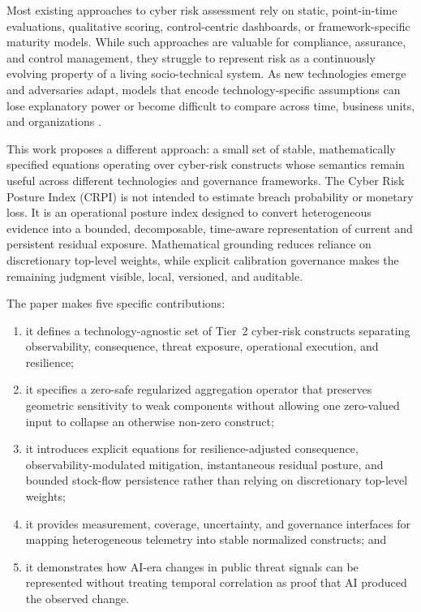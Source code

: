 \documentclass[11pt]{article}
\begin{document}
Most existing approaches to cyber risk assessment rely on static, point-in-time
evaluations, qualitative scoring, control-centric dashboards, or framework-specific
maturity models. While such approaches are valuable for compliance, assurance, and
control management, they struggle to represent risk as a continuously evolving
property of a living socio-technical system. As new technologies emerge and
adversaries adapt, models that encode technology-specific assumptions can lose
explanatory power or become difficult to compare across time, business units, and
organizations \cite{nist-csf,nist80030,iso27001,iso27005,cis-controls,fair-book,cvss31,cvss40}.

This work proposes a different approach: a small set of stable, mathematically
specified equations operating over cyber-risk constructs whose semantics remain useful
across different technologies and governance frameworks. The Cyber Risk Posture Index (CRPI)
is not intended to estimate breach probability or monetary loss. It is an operational
posture index designed to convert heterogeneous evidence into a bounded, decomposable,
time-aware representation of current and persistent residual exposure. Mathematical
grounding reduces reliance on discretionary top-level weights, while explicit
calibration governance makes the remaining judgment visible, local, versioned, and
auditable.

The paper makes five specific contributions:
\begin{enumerate}
  \item it defines a technology-agnostic set of Tier~2 cyber-risk constructs separating
    observability, consequence, threat exposure, operational execution, and resilience;
  \item it specifies a zero-safe regularized aggregation operator that preserves
    geometric sensitivity to weak components without allowing one zero-valued input to
    collapse an otherwise non-zero construct;
  \item it introduces explicit equations for resilience-adjusted consequence,
    observability-modulated mitigation, instantaneous residual posture, and bounded
    stock-flow persistence rather than relying on discretionary top-level weights;
  \item it provides measurement, coverage, uncertainty, and governance interfaces for
    mapping heterogeneous telemetry into stable normalized constructs; and
  \item it demonstrates how AI-era changes in public threat signals can be represented
    without treating temporal correlation as proof that AI produced the observed
    change.
\end{enumerate}
\end{document}
